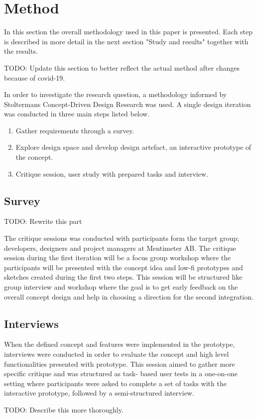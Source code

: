 

\section{Method}
In this section the overall methodology used in this paper is presented. Each step is described in more detail in the next section "Study and results" together with the results.

TODO: Update this section to better reflect the actual method after changes because of covid-19.

In order to investigate the research question, a methodology informed by Stoltermans Concept-Driven Design Research was used. \cite{stolterman_concept-driven_2010}
A single design iteration was conducted in three main steps listed below.

\smallskip
\begin{enumerate}
  \item Gather requirements through a survey.
  \item Explore design space and develop design artefact, an interactive prototype of the concept.
  \item Critique session, user study with prepared tasks and interview.
\end{enumerate}
\smallskip

\subsection{Survey}

TODO: Rewrite this part

The critique sessions was conducted with participants form the target group; developers, designers and project managers at Mentimeter AB. 
The critique session during the first iteration will be a focus group workshop where the participants will be presented with the concept idea and low-fi prototypes and sketches created during the first two steps. 
This session will be structured like group interview and workshop where the goal is to get early feedback on the overall concept design and help in choosing a direction for the second integration.

\subsection{Interviews}
When the defined concept and features were implemented in the prototype, interviews were conducted in order to evaluate the concept and high level functionalities presented with prototype. 
This session aimed to gather more specific critique and was structured as task- based user tests in a one-on-one setting where participants were asked to complete a set of tasks with the interactive prototype, followed by a semi-structured interview.

TODO: Describe this more thoroughly.